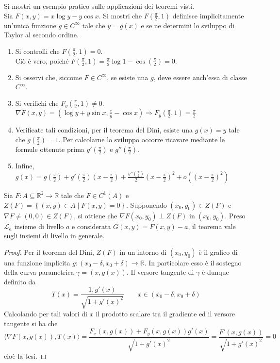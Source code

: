 \begin{example}
    Si mostri un esempio pratico sulle applicazioni dei teoremi visti.\\
    Sia $F(x,y)=x \log y - y \cos x$. Si mostri che $F\left(\tfrac{\pi}{2}, 1\right)$ definisce implicitamente un'unica funzione $g \in C^\infty$ tale che $y=g(x)$ e se ne determini lo sviluppo di Taylor al secondo ordine. 
    \begin{enumerate}
        \item Si controlli che $F\left(\tfrac{\pi}{2}, 1\right)=0$.\\
        Ciò è vero, poiché $F\left(\tfrac{\pi}{2}, 1\right)=\tfrac{\pi}{2} \log 1 - \cos\left(\tfrac{\pi}{2}\right)=0$.
        \item Si osservi che, siccome $F \in C^\infty$, se esiste una $g$, deve essere anch'essa di classe $C^\infty$.
        \item Si verifichi che $F_y(\tfrac{\pi}{2}, 1) \neq 0$.\\
        $\nabla F(x, y) = (\log y + y \sin{x}, \tfrac{x}{y}- \cos{x}) \Rightarrow F_y(\tfrac{\pi}{2},1)=\tfrac{\pi}{2}$
        \item Verificate tali condizioni, per il teorema del Dini, esiste una $g(x)=y$ tale che $g(\tfrac{\pi}{2})=1$. Per calcolarne lo sviluppo occorre ricavare mediante le formule ottenute prima $g'(\tfrac{\pi}{2})$ e $g''(\tfrac{\pi}{2})$.
        \item Infine, $g(x)=g(\tfrac{\pi}{2}) + g'(\tfrac{\pi}{2})(x-\tfrac{\pi}{2})+ \tfrac{g''(\tfrac{\pi}{2})}{2}(x-\tfrac{\pi}{2})^2+ o((x-\tfrac{\pi}{2})^2)$
    \end{enumerate}
\end{example}
\begin{theorem} \label{Teo: Ortogonalità del gradiente alle curve di livello}
    Sia $F: A \subseteq \mathbb{R}^2 \to \mathbb{R}$ tale che $F \in C^1(A)$ e $Z(F)= \left\{(x,y) \in A \mid F(x,y)=0\right\}$. Supponendo $(x_0,y_0) \in Z(F)$ e $\nabla F \neq (0,0) \in Z(F)$, si ottiene che $\nabla F(x_0,y_0) \perp Z(F)$ in $(x_0, y_0)$. Preso $\mathcal{L}_a$ insieme di livello $a$ e considerata $G(x,y)=F(x,y)-a$, il teorema vale sugli insiemi di livello in generale.
\end{theorem}
\begin{proof}
    Per il teorema del Dini, $Z(F)$ in un intorno di $(x_0, y_0)$ è il grafico di una funzione implicita $g: (x_0- \delta, x_0+ \delta) \to \mathbb{R}$. In particolare esso è il sostegno della curva parametrica $\gamma = (x, g(x))$. Il versore tangente di $\gamma$ è dunque definito da
    \begin{equation}
        T(x)= \frac{1, g'(x)}{\sqrt{1+g'(x)^2}} \qquad x \in (x_0- \delta, x_0+ \delta)
    \end{equation}
    Calcolando per tali valori di $x$ il prodotto scalare tra il gradiente ed il versore tangente si ha che
    \begin{equation}
        \langle \nabla F (x, g(x)), T(x) \rangle= \frac{F_x(x, g(x)) + F_y(x, g(x))g'(x)}{\sqrt{1+g'(x)^2}}=\frac{F'(x, g(x))}{\sqrt{1+g'(x)^2}}=0
    \end{equation}
    cioè la tesi.
\end{proof}

